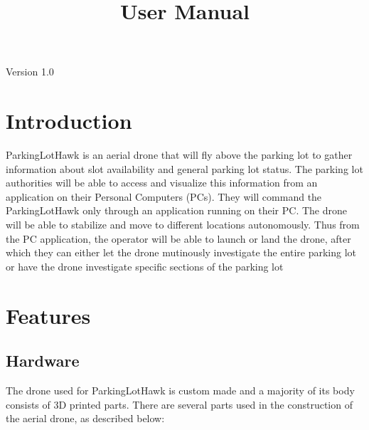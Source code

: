 \documentclass[12pt]{article}
\begin{document}
\title{User Manual}
\author{\authname}
\maketitle

\begin{center}
Version 1.0    
\end{center}

\newpage

\tableofcontents

\listoftables


\newpage

\section{Introduction}

ParkingLotHawk is an aerial drone that will fly above the parking lot to gather information about slot availability and general parking lot status. The parking lot authorities will be able to access and visualize this information from an application on their Personal Computers (PCs). They will command the ParkingLotHawk only through an application running on their PC. The drone will be able to stabilize and move to different locations autonomously. Thus from the PC application, the operator will be able to launch or land the drone, after which they can either let the drone mutinously investigate the entire parking lot or have the drone investigate specific sections of the parking lot

\section{Features}

\subsection{Hardware}

The drone used for ParkingLotHawk is custom made and a majority of its body consists of 3D printed parts. There are several parts used in the construction of the aerial drone, as described below:
\end{document}
